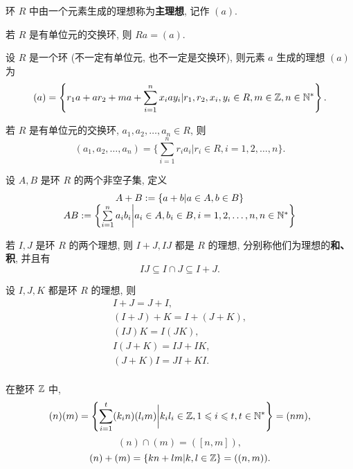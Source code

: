 \begin{definition}\label{主理想}
	环 $R$ 中由一个元素生成的理想称为\textbf{主理想}, 记作 $(a)$.
\end{definition}

\begin{property}
	若 $R$ 是有单位元的交换环, 则 $Ra=(a)$.
\end{property}

\begin{proposition}
	设 $R$ 是一个环 (不一定有单位元, 也不一定是交换环), 则元素 $a$ 生成的理想 $(a)$ 为 $$(a)=\left\{r_1a+ar_2+ma+\sum\limits_{i=1}^n x_iay_i|r_1,r_2,x_i,y_i\in R,m\in\mathbb Z,n\in\mathbb N^*\right\}.$$
\end{proposition}

\begin{proposition}
	若 $R$ 是有单位元的交换环, $a_1,a_2,\ldots,a_n\in R$, 则 $$(a_1,a_2,\ldots,a_n)=\{\sum\limits_{i=1}^n r_ia_i|r_i\in R,i=1,2,\ldots,n\}.$$
\end{proposition}

\begin{definition}\label{集合的运算}
	设 $A,B$ 是环 $R$ 的两个非空子集, 定义
	$$
	\begin{array}{c}
		A+B:=\{a+b|a\in A,b\in B\} \\
		AB:=\left\{\sum\limits_{i=1}^n a_ib_i\bigg|a_i\in A,b_i\in B,i=1,2,\ldots,n,n\in\mathbb N^*\right\}
	\end{array}
	$$
\end{definition}

\begin{definition}\label{理想的运算}
	若 $I,J$ 是环 $R$ 的两个理想, 则 $I+J,IJ$ 都是 $R$ 的理想, 分别称他们为理想的\textbf{和、积}, 并且有 $$IJ\subseteq I\cap J\subseteq I+J.$$
\end{definition}

\begin{property}
	设 $I,J,K$ 都是环 $R$ 的理想, 则
	$$
	\begin{array}{c}
		I+J=J+I, \\
		(I+J)+K=I+(J+K), \\
		(IJ)K=I(JK), \\
		I(J+K)=IJ+IK, \\
		(J+K)I=JI+KI. \\
	\end{array}
	$$
\end{property}

\begin{example}
	在整环 $\mathbb Z$ 中,
	\begin{equation}
		(n)(m)=\left\{\sum\limits_{i=1}^t(k_in)(l_im)\bigg|k_il_i\in\mathbb Z,1\leqslant i\leqslant t,t\in\mathbb N^*\right\}=(nm),
	\end{equation}
	\begin{equation}
		(n)\cap(m)=([n,m]),
	\end{equation}
	\begin{equation}
		(n)+(m)=\{kn+lm|k,l\in\mathbb Z\}=((n,m)).
	\end{equation}

\end{example}



